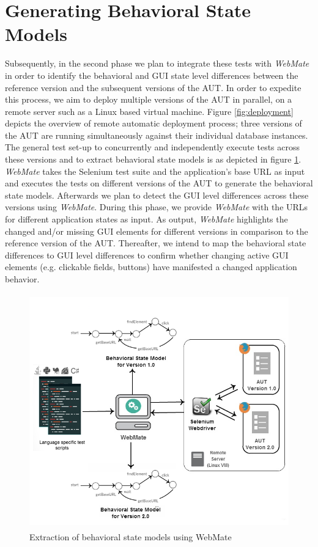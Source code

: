 \section{Generating Behavioral State Models}
\label{sec:BehavModels}

\vspace{-2mm}
Subsequently, in the second phase we plan to integrate these tests with \textit{WebMate} in order to identify the behavioral and GUI state level differences between the reference version and the subsequent versions of the AUT. In order to expedite this process, we aim to deploy multiple versions of the AUT in parallel, on a remote server such as a Linux based virtual machine. Figure  \ref{fig:deployment} depicts the overview of remote automatic deployment process; three versions of the AUT are running simultaneously against their individual database instances. The general test set-up to concurrently and independently execute tests across these versions and to extract behavioral state models is as depicted in figure \ref{fig:stateModelExtraction}.  \textit{WebMate} takes the Selenium test suite and the application’s base URL as input and executes the tests on different versions of the AUT to generate the behavioral state models. Afterwards we plan to detect the GUI level differences across these versions using \textit{WebMate}. During this phase, we provide \textit{WebMate} with the URLs for different application states as input. As output, \textit{WebMate} highlights the changed and/or missing GUI elements for different versions in comparison to the reference version of the AUT. Thereafter, we intend to map the behavioral state differences to GUI level differences to confirm whether changing active GUI elements (e.g. clickable fields, buttons) have manifested a changed application behavior.

\begin{figure}[h!]
\makeatletter 
\renewcommand{\thefigure}{\@arabic\c@figure}
\makeatother
    \centering
  \includegraphics[width=5in,height=4in]{./Figures/WebMate_state_extraction}
  \caption{Extraction of behavioral state models using WebMate \cite{webmate}}
  \label{fig:stateModelExtraction} 
\end{figure}


